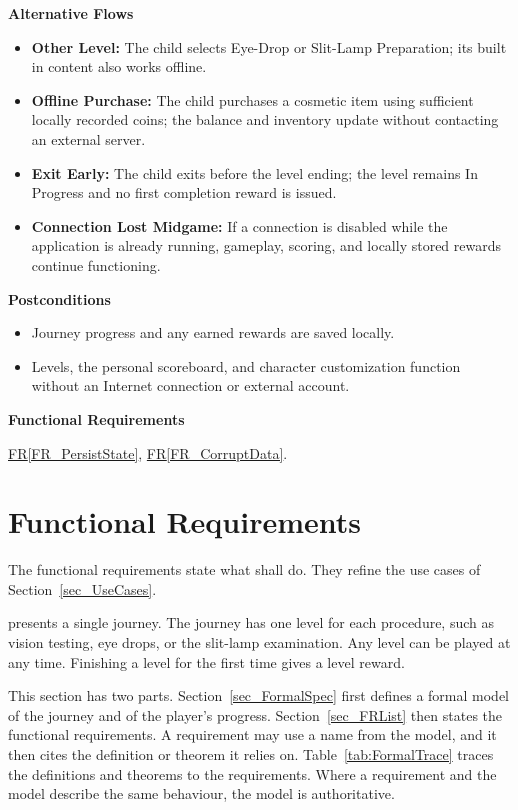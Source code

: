 \documentclass[12pt]{article}
\newcommand{\rref}[1]{\hyperref[#1]{FR\ref*{#1}}}
\begin{document}
\textbf{Alternative Flows}
\begin{itemize}
    \item \textbf{Other Level:} The child selects Eye-Drop or
    Slit-Lamp Preparation; its built in content also works offline.
    \item \textbf{Offline Purchase:} The child purchases a cosmetic
    item using sufficient locally recorded coins; the balance and
    inventory update without contacting an external server.
    \item \textbf{Exit Early:} The child exits before the level ending;
    the level remains In Progress and no first completion reward
    is issued.
    \item \textbf{Connection Lost Midgame:} If a connection is
    disabled while the application is already running, gameplay,
    scoring, and locally stored rewards continue functioning.
\end{itemize}

\textbf{Postconditions}
\begin{itemize}
    \item Journey progress and any earned rewards are saved locally.
    \item Levels, the personal scoreboard, and character customization
    function without an Internet connection or external account.
\end{itemize}

\textbf{Functional Requirements}

\rref{FR_PersistState}, \rref{FR_CorruptData}.

\section{Functional Requirements}
\label{sec_FR}

The functional requirements state what \progname{} shall do. They refine the
use cases of Section~\ref{sec_UseCases}.

\progname{} presents a single journey. The journey has one level for each
procedure, such as vision testing, eye drops, or the slit-lamp examination.
Any level can be played at any time. Finishing a level for the first time gives
a level reward.

This section has two parts. Section~\ref{sec_FormalSpec} first defines a
formal model of the journey and of the player's progress.
Section~\ref{sec_FRList} then states the functional requirements. A
requirement may use a name from the model, and it then cites the definition or
theorem it relies on. Table~\ref{tab:FormalTrace} traces the definitions and
theorems to the requirements. Where a requirement and the model describe the
same behaviour, the model is authoritative.
\end{document}
